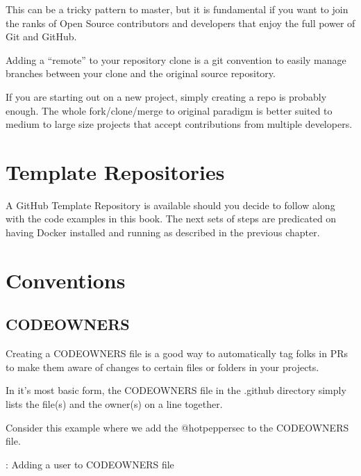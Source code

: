 \justify{}
This can be a tricky pattern to master, but it is fundamental if you
want to join the ranks of Open Source contributors and developers that
enjoy the full power of Git and GitHub.

\justify{}
Adding a ``remote'' to your repository clone is a git convention to easily manage branches between your clone and
the original source repository.

\justify{}
If you are starting out on a new project, simply creating a repo is probably enough. The whole fork/clone/merge to original
paradigm is better suited to medium to large size projects that accept contributions from multiple developers.


\section{Template Repositories}

\justify{}
A GitHub Template Repository is available should you decide to follow along with the code examples in this book. The next sets of steps are
predicated on having Docker installed and running as described in the previous chapter.


\section{Conventions}

\subsection{CODEOWNERS}

\justify{}
Creating a CODEOWNERS file is a good way to automatically tag folks in PRs to make them aware of
changes to certain files or folders in your projects.

\justify{}
In it's most basic form, the CODEOWNERS file in the .github directory
simply lists the file(s) and the owner(s) on a line together.

\justify{}
Consider this example where we add the @hotpeppersec to the CODEOWNERS file.

\begin{mybox}{\thetcbcounter: Adding a user to CODEOWNERS file}
      
\end{mybox}

